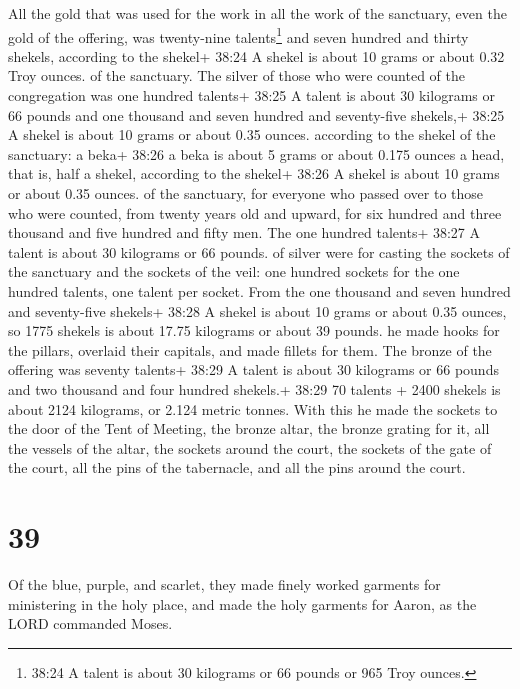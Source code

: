 All the gold that was used for the work in all the work of
the sanctuary, even the gold of the offering, was twenty-nine
talents\footnote{38:24 A talent is about 30 kilograms or 66 pounds or
  965 Troy ounces.} and seven hundred and thirty shekels, according to
the shekel+ 38:24 A shekel is about 10 grams or about 0.32 Troy ounces.
of the sanctuary.  The silver of those who were counted of
the congregation was one hundred talents+ 38:25 A talent is about 30
kilograms or 66 pounds and one thousand and seven hundred and
seventy-five shekels,+ 38:25 A shekel is about 10 grams or about 0.35
ounces. according to the shekel of the sanctuary:  a beka+
38:26 a beka is about 5 grams or about 0.175 ounces a head, that is,
half a shekel, according to the shekel+ 38:26 A shekel is about 10 grams
or about 0.35 ounces. of the sanctuary, for everyone who passed over to
those who were counted, from twenty years old and upward, for six
hundred and three thousand and five hundred and fifty men. 
The one hundred talents+ 38:27 A talent is about 30 kilograms or 66
pounds. of silver were for casting the sockets of the sanctuary and the
sockets of the veil: one hundred sockets for the one hundred talents,
one talent per socket.  From the one thousand and seven
hundred and seventy-five shekels+ 38:28 A shekel is about 10 grams or
about 0.35 ounces, so 1775 shekels is about 17.75 kilograms or about 39
pounds. he made hooks for the pillars, overlaid their capitals, and made
fillets for them.  The bronze of the offering was seventy
talents+ 38:29 A talent is about 30 kilograms or 66 pounds and two
thousand and four hundred shekels.+ 38:29 70 talents + 2400 shekels is
about 2124 kilograms, or 2.124 metric tonnes.  With this he
made the sockets to the door of the Tent of Meeting, the bronze altar,
the bronze grating for it, all the vessels of the altar, 
the sockets around the court, the sockets of the gate of the court, all
the pins of the tabernacle, and all the pins around the court.

\hypertarget{section-38}{%
\section{39}\label{section-38}}

 Of the blue, purple, and scarlet, they made finely worked
garments for ministering in the holy place, and made the holy garments
for Aaron, as the LORD commanded Moses.

